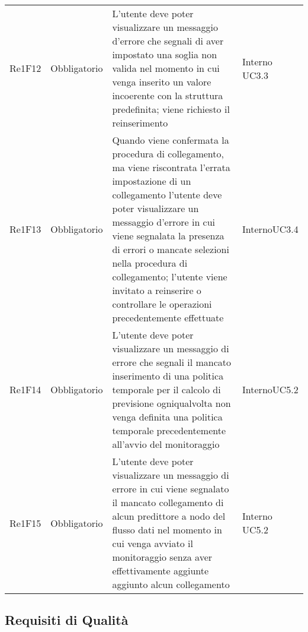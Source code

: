 \begin{longtable}{C{3cm} C{3cm} L{5.5cm} C{3cm}}
Re1F12 & Obbligatorio & L'utente deve poter visualizzare un messaggio d'errore che segnali di aver impostato una soglia non valida nel momento in cui venga inserito un valore incoerente con la struttura predefinita; viene richiesto il reinserimento &  Interno\newline
UC3.3\\
Re1F13 & Obbligatorio & Quando viene confermata la procedura di collegamento, ma viene riscontrata l'errata impostazione di un collegamento l'utente deve poter visualizzare un messaggio d'errore in cui viene segnalata la presenza di errori o mancate selezioni nella procedura di collegamento; l'utente viene invitato a reinserire o controllare le operazioni precedentemente effettuate & Interno\newline UC3.4\\
Re1F14 & Obbligatorio & L'utente deve poter visualizzare un messaggio di errore che segnali il mancato inserimento di una politica temporale per il calcolo di previsione ogniqualvolta non venga definita una politica temporale precedentemente all'avvio del monitoraggio &  Interno\newline UC5.2\\
Re1F15 & Obbligatorio & L'utente deve poter visualizzare un messaggio di errore in cui viene segnalato il mancato collegamento di alcun predittore a nodo del flusso dati nel momento in cui venga avviato il monitoraggio senza aver effettivamente aggiunte aggiunto alcun collegamento &  Interno\newline
UC5.2\\

\end{longtable}


\pagebreak
 	\subsection{Requisiti di Qualità}

